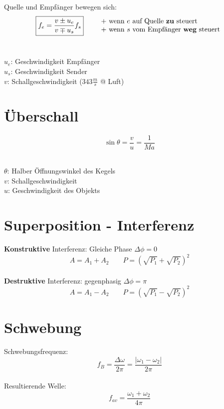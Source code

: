 Quelle und Empfänger bewegen sich:
\[\boxed{
	f_e = \frac{v \pm u_e}{v \mp u_s}f_s
} \qquad
	\begin{array}{l}
	+ \text{ wenn $e$ auf Quelle \textbf{zu} steuert} \\ 
	+ \text{ wenn $s$ vom Empfänger \textbf{weg} steuert}
	\end{array} 
\]
\\
\begin{footnotesize}
	$u_e$: Geschwindigkeit Empfänger\\
	$u_s$: Geschwindigkeit Sender\\
	$v$: Schallgeschwindigkeit ($343\frac{m}{s}$ @ Luft)
\end{footnotesize}



\section{Überschall}

\[\boxed{
	\sin \theta = \frac{v}{u} = \frac{1}{Ma}
}\]
\\
\begin{footnotesize}
	$\theta$: Halber Öffnungswinkel des Kegels\\
	$v$: Schallgeschwindigkeit\\
	$u$: Geschwindigkeit des Objekts\\
\end{footnotesize}


\section{Superposition - Interferenz}
\textbf{Konstruktive} Interferenz: Gleiche Phase $\Delta \phi = 0$
\[
	A = A_1 + A_2 \qquad P = \left( \sqrt{P_1} + \sqrt{P_2} \right)^2
\]
\\
\textbf{Destruktive} Interferenz: gegenphasig $\Delta \phi = \pi$
\[
	A = A_1 - A_2 \qquad P = \left( \sqrt{P_1} - \sqrt{P_2} \right)^2
\]


\section{Schwebung}
Schwebungsfrequenz:
\[\boxed{
	f_B = \frac{\Delta \omega}{2\pi} = \frac{\left| \omega_1 - \omega_2 \right|}{2\pi}
}\]
\\
Resultierende Welle:
\[
	f_{av} = \frac{\omega_1 + \omega_2}{4\pi}
\]



